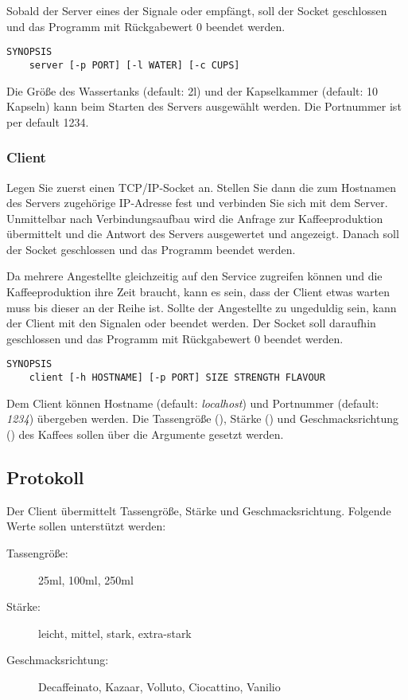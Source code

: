 Sobald der Server eines der Signale  oder
 empfängt, soll der Socket geschlossen und das
Programm mit Rückgabewert 0 beendet werden.

\begin{verbatim}
SYNOPSIS
    server [-p PORT] [-l WATER] [-c CUPS]
\end{verbatim}

Die Größe des Wassertanks (default: 2l) und der Kapselkammer (default: 10
Kapseln) kann beim Starten des Servers ausgewählt werden. Die Portnummer ist
per default 1234.

\subsubsection*{Client}
Legen Sie zuerst einen TCP/IP-Socket an. Stellen Sie dann die zum Hostnamen des
Servers zugehörige IP-Adresse fest und verbinden Sie sich mit dem
Server. Unmittelbar nach Verbindungsaufbau wird die Anfrage zur
Kaffeeproduktion übermittelt und die Antwort des Servers ausgewertet und
angezeigt. Danach soll der Socket geschlossen und das Programm beendet werden.

Da mehrere Angestellte gleichzeitig auf den Service zugreifen können und die
Kaffeeproduktion ihre Zeit braucht, kann es sein, dass der Client etwas warten
muss bis dieser an der Reihe ist. Sollte der Angestellte zu ungeduldig sein,
kann der Client mit den Signalen  oder 
beendet werden. Der Socket soll daraufhin geschlossen und das Programm mit
Rückgabewert 0 beendet werden.

\begin{verbatim}
SYNOPSIS
    client [-h HOSTNAME] [-p PORT] SIZE STRENGTH FLAVOUR
\end{verbatim}

Dem Client können Hostname (default: \emph{localhost}) und Portnummer (default:
\emph{1234}) übergeben werden. Die Tassengröße (), Stärke
() und Geschmacksrichtung () des Kaffees
sollen über die Argumente gesetzt werden.

\subsection*{Protokoll}
\label{sec:prot}
Der Client übermittelt Tassengröße, Stärke und Geschmacksrichtung. Folgende
Werte sollen unterstützt werden:
%
\begin{description}
\item[Tassengröße:] 25ml, 100ml, 250ml
\item[Stärke:] leicht, mittel, stark, extra-stark
\item[Geschmacksrichtung:] Decaffeinato, Kazaar, Volluto, Ciocattino, Vanilio
\end{description}

